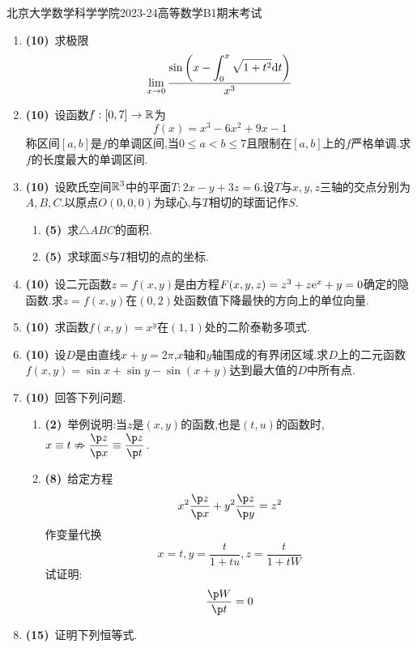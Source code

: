 \documentclass{ctexart}
\begin{document}
\pagestyle{empty}

\begin{center}\Large
    北京大学数学科学学院2023-24高等数学B1期末考试
\end{center}
\begin{enumerate}[leftmargin=*,label=\textbf{\arabic*.}]
    \item \textbf{(10)}\ 求极限\[\lim_{x\to0}\dfrac{\sin\left(x-\displaystyle\int_0^x\sqrt{1+t^2}\mathrm{d} t\right)}{x^3}\]
    \item \textbf{(10)}\ 设函数$f:[0,7]\to\mathbb{R}$为\[f(x)=x^3-6x^2+9x-1\]称区间$[a,b]$是$f$的单调区间,当$0\leqslant a<b\leqslant 7$且限制在$[a,b]$上的$f$严格单调.求$f$的长度最大的单调区间.
    \item \textbf{(10)}\ 设欧氏空间$\mathbb{R}^3$中的平面$T:2x-y+3z=6$.设$T$与$x,y,z$三轴的交点分别为$A,B,C$.以原点$O(0,0,0)$为球心,与$T$相切的球面记作$S$.
        \begin{enumerate}[label=\tbf{(\arabic*)}]
            \item \textbf{(5)}\ 求$\triangle ABC$的面积.
            \item \textbf{(5)}\ 求球面$S$与$T$相切的点的坐标.
        \end{enumerate}
    \item \textbf{(10)}\ 设二元函数$z=f(x,y)$是由方程$F(x,y,z)=z^3+z\mathrm{e}^x+y=0$确定的隐函数.求$z=f(x,y)$在$(0,2)$处函数值下降最快的方向上的单位向量.
    \item \textbf{(10)}\ 求函数$f(x,y)=x^y$在$(1,1)$处的二阶泰勒多项式.
    \item \textbf{(10)}\ 设$D$是由直线$x+y=2\pi$,$x$轴和$y$轴围成的有界闭区域.求$D$上的二元函数$f(x,y)=\sin x+\sin y-\sin(x+y)$达到最大值的$D$中所有点.
    \item \textbf{(10)}\ 回答下列问题.
        \begin{enumerate}[label=\tbf{(\arabic*)}]
            \item \textbf{(2)}\ 举例说明:当$z$是$(x,y)$的函数,也是$(t,u)$的函数时,$x\equiv t\nRightarrow \dfrac{\p z}{\p x}\equiv\dfrac{\p z}{\p t}$.
            \item \textbf{(8)}\ 给定方程\[x^2\dfrac{\p z}{\p x}+y^2\dfrac{\p z}{\p y}=z^2\]作变量代换\[x=t,y=\dfrac{t}{1+tu},z=\dfrac{t}{1+tW}\]试证明:\[\dfrac{\p W}{\p t}=0\]
        \end{enumerate}
    \item \textbf{(15)}\ 证明下列恒等式.
        \begin{enumerate}[label=\tbf{(\arabic*)}]

\end{enumerate}
\end{enumerate}
\end{document}
